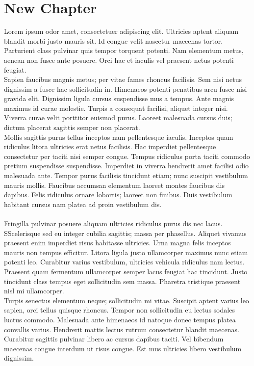 \documentclass{article}
\begin{document}
\section{New Chapter}
Lorem ipsum odor amet, consectetuer adipiscing elit. Ultricies aptent aliquam blandit morbi justo mauris sit. Id congue velit nascetur maecenas tortor. Parturient class pulvinar quis tempor torquent potenti. Nam elementum metus, aenean non fusce ante posuere. Orci hac et iaculis vel praesent netus potenti feugiat.\\Sapien faucibus magnis metus; per vitae fames rhoncus facilisis. Sem nisi netus dignissim a fusce hac sollicitudin in. Himenaeos potenti penatibus arcu fusce nisi gravida elit. Dignissim ligula cursus suspendisse mus a tempus. Ante magnis maximus id curae molestie. Turpis a consequat facilisi, aliquet integer nisi. Viverra curae velit porttitor euismod purus. Laoreet malesuada cursus duis; dictum placerat sagittis semper non placerat.\\Mollis sagittis purus tellus inceptos nam pellentesque iaculis. Inceptos quam ridiculus litora ultricies erat netus facilisis. Hac imperdiet pellentesque consectetur per taciti nisi semper congue. Tempus ridiculus porta taciti commodo pretium suspendisse suspendisse. Imperdiet in viverra hendrerit amet facilisi odio malesuada ante. Tempor purus facilisis tincidunt etiam; nunc suscipit vestibulum mauris mollis. Faucibus accumsan elementum laoreet montes faucibus dis dapibus. Felis ridiculus ornare lobortis; laoreet non finibus. Duis vestibulum habitant cursus nam platea ad proin vestibulum dis.\\\\Fringilla pulvinar posuere aliquam ultricies ridiculus purus dis nec lacus. SScelerisque sed eu integer cubilia sagittis; massa per phasellus. Aliquet vivamus praesent enim imperdiet risus habitasse ultricies. Urna magna felis inceptos mauris non tempus efficitur. Litora ligula justo ullamcorper maximus nunc etiam potenti leo. Curabitur varius vestibulum, ultricies vehicula ridiculus nam lectus. Praesent quam fermentum ullamcorper semper lacus feugiat hac tincidunt. Justo tincidunt class tempus eget sollicitudin sem massa. Pharetra tristique praesent nisl mi ullamcorper.\\Turpis senectus elementum neque; sollicitudin mi vitae. Suscipit aptent varius leo sapien, orci tellus quisque rhoncus. Tempor non sollicitudin eu lectus sodales luctus commodo. Malesuada ante himenaeos id natoque donec tempus platea convallis varius. Hendrerit mattis lectus rutrum consectetur blandit maecenas. Curabitur sagittis pulvinar libero ac cursus dapibus taciti. Vel bibendum maecenas congue interdum ut risus congue. Est mus ultricies libero vestibulum dignissim.\\
\end{document}
